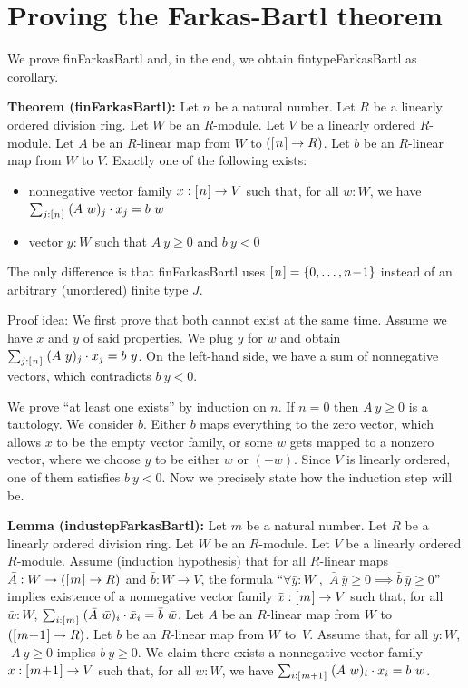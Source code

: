 \documentclass[]{article}
\renewcommand{\.}{\hskip .75pt}
\newcommand{\fin}[1]{[\.#1\.]}
\DeclareMathOperator{\st}{,\;}
\let\r=\rightarrow
\begin{document}
\section {Proving the Farkas-Bartl theorem}
\label{bartl}

We prove finFarkasBartl and, in the end, we obtain fintypeFarkasBartl as corollary.

\medskip \noindent
\textbf{Theorem (finFarkasBartl):}
Let $n$ be a natural number.
Let $R$ be a linearly ordered division ring.
Let $W$ be an $R$-module.
Let $V$ be a linearly ordered $R$-module.
Let $A$ be an $R$-linear map from $W$ to $(\fin{n} \r R)$.
Let $b$ be an $R$-linear map from $W$ to $V$.
Exactly one of the following exists:
\begin{itemize}
\item nonnegative vector family $x : \fin{n} \r V$ such that, for all $w : W$, we have
$ \sum_{j : \fin{n}}\; (A~w)_j \cdot x_j = b~w $
\item vector $y : W$ such that $A~y \ge 0$ and $b~y < 0$
\end{itemize}
The only difference is that finFarkasBartl uses $\fin{n} = \{ 0, \dots, n\!-\!1 \}$
instead of an arbitrary (unordered) finite type $J$.

\medskip \noindent
Proof idea:
We first prove that both cannot exist at the same time.
Assume we have $x$ and $y$ of said properties.
We plug $y$ for $w$ and obtain
$ \sum_{j : \fin{n}}\; (A~y)_j \cdot x_j = b~y $.
On the left-hand side, we have a sum of nonnegative vectors,
which contradicts $b~y < 0$.
\smallskip

We prove ``at least one exists'' by induction on $n$.
If $n=0$ then $A~y \ge 0$ is a tautology.
We consider $b$. Either $b$ maps everything to the
zero vector, which allows $x$ to be the empty vector family,
or some $w$ gets mapped to a nonzero vector, where
we choose $y$ to be either $w$ or $(-w)$.
Since $V$ is linearly ordered, one of them satisfies $b~y<0$.
Now we precisely state how the induction step will be.

\medskip \noindent
\textbf{Lemma (industepFarkasBartl):}
Let $m$ be a natural number.
Let $R$ be a linearly ordered division ring.
Let $W$ be an $R$-module.
Let $V$ be a linearly ordered $R$-module.
Assume (induction hypothesis) that
for all $R$-linear maps $\bar{A} : W \r (\fin{m} \r R)$
and $\bar{b} : W \r V$, the formula
``$\forall \bar{y} : W \st \bar{A}~\bar{y} \ge 0 \implies \bar{b}~\bar{y} \ge 0$''
implies existence of a nonnegative vector family $\bar{x} : \fin{m} \r V$ such that,
for all $\bar{w} : W$, $ \sum_{i : \fin{m}}\; (\bar{A}~\bar{w})_i \cdot \bar{x}_i = \bar{b}~\bar{w} $.
Let $A$ be an $R$-linear map from $W$ to $(\fin{m\!+\!1} \r R)$.
Let $b$ be an $R$-linear map from $W$ to~$V$.
Assume that, for all $y : W$, $\;A~y \ge 0$ implies $b~y \ge 0$.
We claim there exists a nonnegative vector family $x : \fin{m\!+\!1} \r V$
such that, for all $w : W$, we have
$ \sum_{i : \fin{m+1}}\; (A~w)_i \cdot x_i = b~w $.
\end{document}
